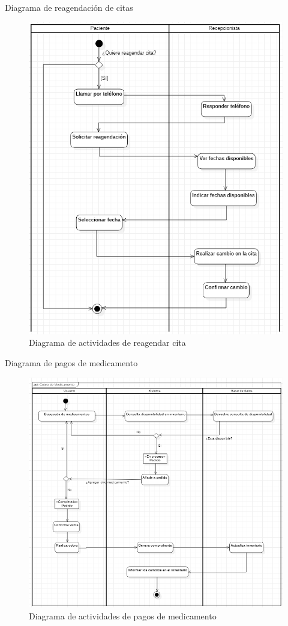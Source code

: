 \documentclass[12pt,letterpaper]{article}
\begin{document}
    \newpage
    Diagrama de reagendación de citas
    \begin{figure}[H]
        \centering
        \includegraphics [scale=0.7]{actividades/reagendarCita}
        \caption{Diagrama de actividades de reagendar cita}
    \end{figure}

    \newpage
    Diagrama de pagos de medicamento
    \begin{figure}[H]
        \centering
        \includegraphics [scale=0.7]{actividades/pagarMedicamento}
        \caption{Diagrama de actividades de pagos de medicamento}
    \end{figure}
\end{document}
